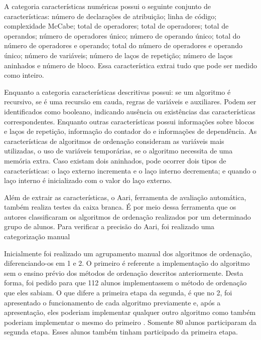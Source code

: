 	    A categoria características numéricas possui o seguinte conjunto de características:
	    número de declarações de atribuição; linha de código; complexidade McCabe; total de
	    operadores; total de operadores; total de operandos; número de operadores único;
	    número de operando único; total do número de operadores e operando; total do
	    número de operadores e operando único; número de variáveis; número de laços de
	    repetição; número de laços aninhados e número de bloco. Essa característica
	    extrai tudo que pode ser medido como inteiro.
	    
	    Enquanto a categoria características descritivas possui: se um algoritmo é
	    recursivo, se é uma recursão em cauda, regras de variáveis e 
	    auxiliares. Podem ser identificados como booleano, indicando ausência ou
	    existências das características correspondentes. Enquanto outras características
	    possui informações sobre blocos e laços de repetição, informação do contador do
	     e informações de dependência. As características de algoritmos de
	    ordenação consideram as variáveis mais utilizadas, o uso de variáveis temporárias,
	    se o algoritmo necessita de uma memória extra. Caso existam dois  aninhados,
	    pode ocorrer dois tipos de características: o laço externo incrementa e o laço
	    interno decrementa; e quando o laço interno é inicializado com o valor do laço
	    externo. 
	    
	    Além de extrair as características, o Aari, ferramenta de avaliação automática,
	    também realiza testes da caixa branca. É por meio dessa ferramenta que os
	    autores classificaram os algoritmos de ordenação realizados por um determinado
	    grupo de alunos. Para verificar a precisão do Aari, foi realizado uma
	    categorização manual
	    
	    Inicialmente foi realizado um agrupamento manual dos algoritmos de ordenação,
	    diferenciando-os em  1 e  2. O primeiro
	     é referente a implementação do algoritmo sem o ensino
	    prévio dos métodos de ordenação descritos anteriormente. Desta forma,
	    foi pedido para que 112 alunos implementassem o método de ordenação que
	    eles sabiam. O que difere a primeira etapa da segunda, é que no 
	    2, foi apresentado o funcionamento de cada algoritmo previamente e, após a
	    apresentação, eles poderiam implementar qualquer outro algoritmo como também
	    poderiam implementar o mesmo do primeiro . Somente 80 alunos
	    participaram da segunda etapa. Esses alunos também tinham participado da
	    primeira etapa.
	    
